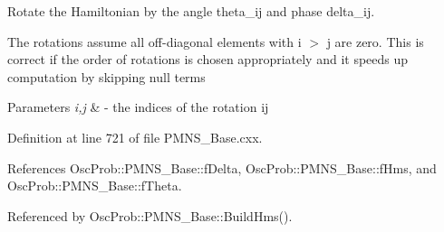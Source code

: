 Rotate the Hamiltonian by the angle theta\+\_\+ij and phase delta\+\_\+ij.

The rotations assume all off-\/diagonal elements with i $>$ j are zero. This is correct if the order of rotations is chosen appropriately and it speeds up computation by skipping null terms


\begin{DoxyParams}{Parameters}
{\em i,j} & -\/ the indices of the rotation ij \\
\hline
\end{DoxyParams}


Definition at line 721 of file P\+M\+N\+S\+\_\+\+Base.\+cxx.



References Osc\+Prob\+::\+P\+M\+N\+S\+\_\+\+Base\+::f\+Delta, Osc\+Prob\+::\+P\+M\+N\+S\+\_\+\+Base\+::f\+Hms, and Osc\+Prob\+::\+P\+M\+N\+S\+\_\+\+Base\+::f\+Theta.



Referenced by Osc\+Prob\+::\+P\+M\+N\+S\+\_\+\+Base\+::\+Build\+Hms().


